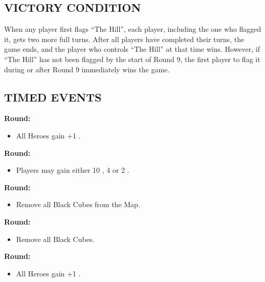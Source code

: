 \begin{multicols*}{2}
\subsection*{\MakeUppercase{Victory Condition}}
When any player first flags ``The Hill'', each player, including the one who flagged it, gets two more full turns. After all players have completed their turns, the game ends, and the player who controls ``The Hill'' at that time wins. However, if ``The Hill'' has not been flagged by the start of Round 9, the first player to flag it during or after Round 9 immediately wins the game.

\subsection*{\MakeUppercase{Timed Events}}
\textbf{ Round:}
\begin{itemize}
  \item All Heroes gain +1 .
\end{itemize}
\textbf{ Round:}
\begin{itemize}
  \item Players may gain either 10 , 4  or 2 .
\end{itemize}
\textbf{ Round:}
\begin{itemize}
  \item Remove all Black Cubes from the Map.
\end{itemize}
\textbf{ Round:}
\begin{itemize}
  \item Remove all Black Cubes.
\end{itemize}
\textbf{ Round:}
\begin{itemize}
  \item All Heroes gain +1 .
\end{itemize}


\end{multicols*}
